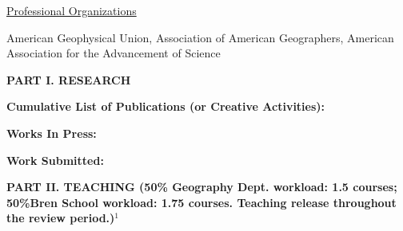 \documentclass[10pt]{article}
\begin{document}
\vspace{0.5cm}
\underline{Professional Organizations}

American Geophysical Union, Association of American Geographers, American Association for the Advancement of Science

\vspace{0.5cm}

\textbf{PART I.  RESEARCH}

\vspace{0.2cm}
{\bf Cumulative List of Publications (or Creative Activities):}

\vspace{0.2cm}
{\setlength{\extrarowheight}{3.5pt}
}

\vspace{0.2cm}
{\bf Works In Press:}

\vspace{0.15cm}
{\setlength{\extrarowheight}{3.5pt}

}


\vspace{0.2cm}
{\bf Work Submitted:}

\vspace{0.15cm}
{\setlength{\extrarowheight}{3.5pt}

}


% 


%
%

\vspace{1cm}
\textbf{PART II.  TEACHING (50\% Geography Dept. workload: 1.5 courses; 50\%Bren School workload: 1.75 courses. Teaching release throughout the review period.)$^1$}
\end{document}
